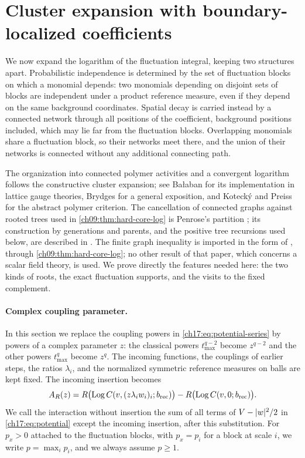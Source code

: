 \section{Cluster expansion with boundary-localized coefficients}\label{ch17:sec:expansion}

We now expand the logarithm of the fluctuation integral, keeping two structures apart. Probabilistic independence is determined by the set of fluctuation blocks on which a monomial depends: two monomials depending on disjoint sets of blocks are independent under a product reference measure, even if they depend on the same background coordinates. Spatial decay is carried instead by a connected network through all positions of the coefficient, background positions included, which may lie far from the fluctuation blocks. Overlapping monomials share a fluctuation block, so their networks meet there, and the union of their networks is connected without any additional connecting path.

The organization into connected polymer activities and a convergent logarithm follows the constructive cluster expansion; see Ba\l aban \cite{Balaban1988RGII,Balaban1988Convergent} for its implementation in lattice gauge theories, Brydges \cite{Brydges1986} for a general exposition, and Koteck\'y and Preiss \cite{KoteckyPreiss1986} for the abstract polymer criterion. The cancellation of connected graphs against rooted trees used in \cref{ch09:thm:hard-core-log} is Penrose's partition \cite{Penrose1967}; its construction by generations and parents, and the positive tree recursions used below, are described in \cite[Sections~2 and~4.1]{FernandezProcacci2007}. The finite graph inequality is imported in the form of \cite[Appendix~B, (323), p.~42]{Dimock2013v2}, through \cref{ch09:thm:hard-core-log}; no other result of that paper, which concerns a scalar field theory, is used. We prove directly the features needed here: the two kinds of roots, the exact fluctuation supports, and the visits to the fixed complement.

\paragraph{Complex coupling parameter.}
In this section we replace the coupling powers in \eqref{ch17:eq:potential-series} by powers of a complex parameter $z$: the classical powers $t_{\max}^{q-2}$ become $z^{q-2}$ and the other powers $t_{\max}^q$ become $z^q$. The incoming functions, the couplings of earlier steps, the ratios $\lambda_i$, and the normalized symmetric reference measures on balls are kept fixed. The incoming insertion becomes
\[
 A_R(z)=R\bigl(\operatorname{Log} C(v,(z\lambda_iw_i)_i;b_{\mathrm{rec}})\bigr)-R\bigl(\operatorname{Log} C(v,0;b_{\mathrm{rec}})\bigr).
\]
We call the interaction without insertion the sum of all terms of $V-\lvert w\rvert^2/2$ in \eqref{ch17:eq:potential} except the incoming insertion, after this substitution. For $p_x>0$ attached to the fluctuation blocks, with $p_x=p_i$ for a block at scale $i$, we write $p=\max_ip_i$, and we always assume $p\ge1$.


